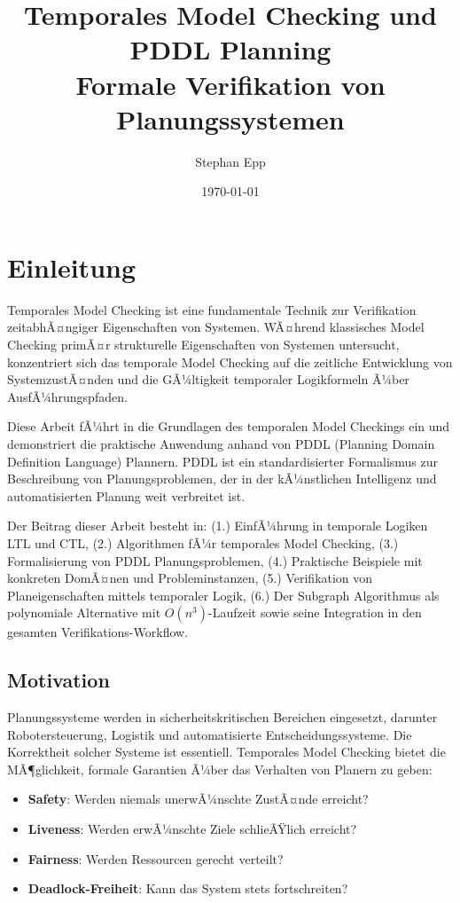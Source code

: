 ﻿\documentclass[a4paper,12pt]{article}
\title{Temporales Model Checking und PDDL Planning\\
	\large{Formale Verifikation von Planungssystemen}}
\author{Stephan Epp}
\date{\today}
\theoremstyle{definition}
\begin{document}
	
\maketitle

\tableofcontents
\newpage

\section{Einleitung}

Temporales Model Checking ist eine fundamentale Technik zur Verifikation zeitabhÃ¤ngiger Eigenschaften von Systemen. WÃ¤hrend klassisches Model Checking primÃ¤r strukturelle Eigenschaften von Systemen untersucht, konzentriert sich das temporale Model Checking auf die zeitliche Entwicklung von SystemzustÃ¤nden und die GÃ¼ltigkeit temporaler Logikformeln Ã¼ber AusfÃ¼hrungspfaden.

Diese Arbeit fÃ¼hrt in die Grundlagen des temporalen Model Checkings ein und demonstriert die praktische Anwendung anhand von PDDL (Planning Domain Definition Language) Plannern. PDDL ist ein standardisierter Formalismus zur Beschreibung von Planungsproblemen, der in der kÃ¼nstlichen Intelligenz und automatisierten Planung weit verbreitet ist.

Der Beitrag dieser Arbeit besteht in: (1.) EinfÃ¼hrung in temporale Logiken LTL und CTL, (2.) Algorithmen fÃ¼r temporales Model Checking, (3.) Formalisierung von PDDL Planungsproblemen, (4.) Praktische Beispiele mit konkreten DomÃ¤nen und Probleminstanzen, (5.) Verifikation von Planeigenschaften mittels temporaler Logik, (6.) Der Subgraph Algorithmus als polynomiale Alternative mit $O(n^3)$-Laufzeit sowie seine Integration in den gesamten Verifikations-Workflow.

\subsection{Motivation}

Planungssysteme werden in sicherheitskritischen Bereichen eingesetzt, darunter Robotersteuerung, Logistik und automatisierte Entscheidungssysteme. Die Korrektheit solcher Systeme ist essentiell. Temporales Model Checking bietet die MÃ¶glichkeit, formale Garantien Ã¼ber das Verhalten von Planern zu geben:

\begin{itemize}
	\item[-] \textbf{Safety}: Werden niemals unerwÃ¼nschte ZustÃ¤nde erreicht?
	\item[-] \textbf{Liveness}: Werden erwÃ¼nschte Ziele schlieÃŸlich erreicht?
	\item[-] \textbf{Fairness}: Werden Ressourcen gerecht verteilt?
	\item[-] \textbf{Deadlock-Freiheit}: Kann das System stets fortschreiten?
\end{itemize}
\end{document}
